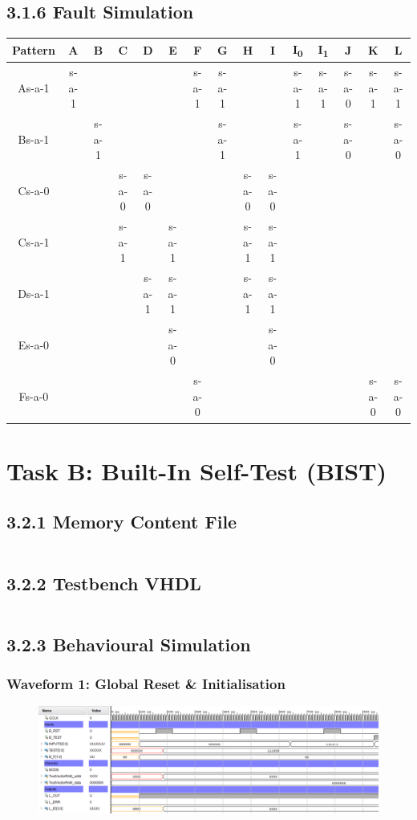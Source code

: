 \documentclass[11pt]{report}
\begin{document}
\section*{3.1.6 Fault Simulation}
\begin{tabular}{|c||c|c|c|c|c|c|c|c|c|c|c|c|c|c|}
\hline
Pattern & A & B & C & D & E & F & G & H & I & I\textsubscript{0} & I\textsubscript{1} & J & K & L \\
\hline
\hline
As-a-1 & s-a-1 & & & & & s-a-1 & s-a-1 & & & s-a-1 & s-a-1 & s-a-0 & s-a-1 & s-a-1 \\
\hline
Bs-a-1 & & s-a-1 & & & & & s-a-1 & & & s-a-1 & & s-a-0 & & s-a-0 \\
\hline
Cs-a-0 & & & s-a-0 & s-a-0 & & & & s-a-0 & s-a-0 & & & & & \\
\hline
Cs-a-1 & & & s-a-1 & & s-a-1 & & & s-a-1 & s-a-1 & & & & & \\
\hline
Ds-a-1 & & & & s-a-1 & s-a-1 & & & s-a-1 & s-a-1 & & & & & \\
\hline
Es-a-0 & & & & & s-a-0 & & & & s-a-0 & & & & & \\
\hline
Fs-a-0 & & & & & & s-a-0 & & & & & & & s-a-0 & s-a-0 \\
\hline
\end{tabular}



\chapter*{Task B: Built-In Self-Test (BIST)}


\section*{3.2.1 Memory Content File}
\inputminted{text}{"../../DE_Lab4/DE_Lab4.srcs/sources_1/imports/Desktop/lab4_coefficient.coe"}


\section*{3.2.2 Testbench VHDL}
\inputminted{vhdl}{"../../DE_Lab4/DE_Lab4.srcs/sim_1/new/bist_tb.vhd"}



\section*{3.2.3 Behavioural Simulation}

\subsection*{Waveform 1: Global Reset \& Initialisation}
\begin{figure}[H]
    \includegraphics[width=\columnwidth]{Reports/Lab4/Assets/3.2.3_test1.png}
\end{figure}
\end{document}
